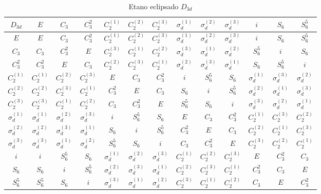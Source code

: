 \documentclass[a4paper,10pt]{article}
\begin{document}
\begin{table}[ht]
\caption{Etano eclipsado $D_{3d}$}
\centering

\begin{tabular} { |c|c c c c c c c c c c c c | }
\hline
$D_{3d}$ & $E$ & $C_3$ & $C_3^2$ & $C_2^{(1)}$ & $C_2^{(2)}$ & $C_2^{(3)}$ & $\sigma_d^{(1)}$ & $\sigma_d^{(2)}$ & $\sigma_d^{(3)}$ & $i$ & $S_6$ & $S_6^5$ \\
\hline
$E$ & $E$ & $C_3$ & $C_3^2$ & $C_2^{(1)}$ & $C_2^{(2)}$ & $C_2^{(3)}$ & $\sigma_d^{(1)}$ & $\sigma_d^{(2)}$ & $\sigma_d^{(3)}$ & $i$ & $S_6$ & $S_6^5$ \\
$C_3$ & $C_3$ & $C_3^2$ & $E$ & $C_2^{(3)}$ & $C_2^{(1)}$ & $C_2^{(2)}$ & $\sigma_d^{(3)}$ & $\sigma_d^{(1)}$ & $\sigma_d^{(2)}$ & $S_6^5$ & $i$ & $S_6$ \\
$C_3^2$ & $C_3^2$ & $E$ & $C_3$ & $C_2^{(2)}$ & $C_2^{(3)}$ & $C_2^{(1)}$ & $\sigma_d^{(2)}$ & $\sigma_d^{(3)}$ & $\sigma_d^{(1)}$ & $S_6$ & $S_6^5$ & $i$ \\
$C_2^{(1)}$ & $C_2^{(1)}$ & $C_2^{(2)}$ & $C_2^{(3)}$ & $E$ & $C_3$ & $C_3^2$ & $i$ & $S_6^5$ & $S_6$ & $\sigma_d^{(1)}$ & $\sigma_d^{(3)}$ & $\sigma_d^{(2)}$ \\
$C_2^{(2)}$ & $C_2^{(2)}$ & $C_2^{(3)}$ & $C_2^{(1)}$ & $C_3^2$ & $E$ & $C_3$ & $S_6$ & $i$ & $S_6^5$ & $\sigma_d^{(2)}$ & $\sigma_d^{(1)}$ & $\sigma_d^{(3)}$ \\
$C_2^{(3)}$ & $C_2^{(3)}$ & $C_2^{(1)}$ & $C_2^{(2)}$ & $C_3$ & $C_3^2$ & $E$ & $S_6^5$ & $S_6$ & $i$ & $\sigma_d^{(3)}$ & $\sigma_d^{(2)}$ & $\sigma_d^{(1)}$ \\
$\sigma_d^{(1)}$ & $\sigma_d^{(1)}$ & $\sigma_d^{(2)}$ & $\sigma_d^{(3)}$ & $i$ & $S_6^5$ & $S_6$ & $E$ & $C_3$ & $C_3^2$ & $C_2^{(1)}$ & $C_2^{(3)}$ & $C_2^{(2)}$ \\
$\sigma_d^{(2)}$ & $\sigma_d^{(2)}$ & $\sigma_d^{(3)}$ & $\sigma_d^{(1)}$ & $S_6$ & $i$ & $S_6^5$ & $C_3^2$ & $E$ & $C_3$ & $C_2^{(2)}$ & $C_2^{(1)}$ & $C_2^{(3)}$ \\
$\sigma_d^{(3)}$ & $\sigma_d^{(3)}$ & $\sigma_d^{(1)}$ & $\sigma_d^{(2)}$ & $S_6^5$ & $S_6$ & $i$ & $C_3$ & $C_3^2$ & $E$ & $C_2^{(3)}$ & $C_2^{(2)}$ & $C_2^{(1)}$ \\
$i$ & $i$ & $S_6^5$ & $S_6$ & $\sigma_d^{(1)}$ & $\sigma_d^{(2)}$ & $\sigma_d^{(3)}$ & $C_2^{(1)}$ & $C_2^{(2)}$ & $C_2^{(3)}$ & $E$ & $C_3^2$ & $C_3$ \\
$S_6$ & $S_6$ & $i$ & $S_6^5$ & $\sigma_d^{(2)}$ & $\sigma_d^{(3)}$ & $\sigma_d^{(1)}$ & $C_2^{(2)}$ & $C_2^{(3)}$ & $C_2^{(1)}$ & $C_3^2$ & $C_3$ & $E$ \\
$S_6^5$ & $S_6^5$ & $S_6$ & $i$ & $\sigma_d^{(3)}$ & $\sigma_d^{(1)}$ & $\sigma_d^{(2)}$ & $C_2^{(3)}$ & $C_2^{(1)}$ & $C_2^{(2)}$ & $C_3$ & $E$ & $C_3^2$ \\
\hline
\end{tabular}

\label{tab:mult}
\end{table}
\end{document}
